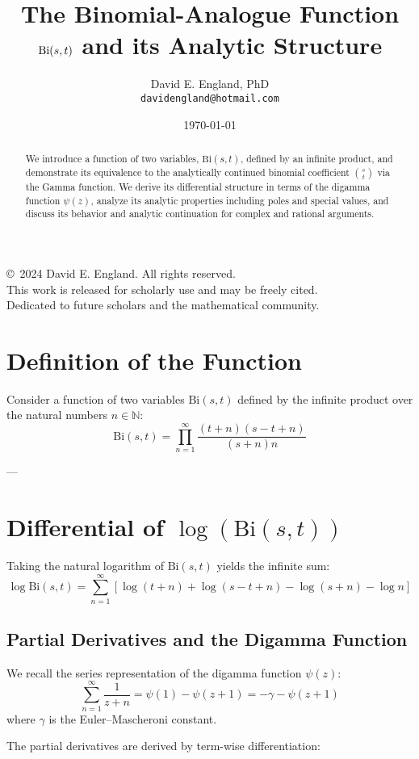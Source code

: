 \documentclass{article}
\title{The Binomial-Analogue Function $\Bi(s,t)$ and its Analytic Structure}
\author{David E. England, PhD \\ \texttt{davidengland@hotmail.com}}
\date{\today}
\newcommand{\Bi}{\mathrm{Bi}}
\newcommand{\eulergam}{\gamma} %
\newcommand{\copyrightnote}{
  \vspace{2em}
  \begin{center}
    \small
    \copyright~2024 David E. England. All rights reserved.\\
    This work is released for scholarly use and may be freely cited.\\
    Dedicated to future scholars and the mathematical community.
  \end{center}
  \vspace{2em}
}
\begin{document}
\maketitle
\copyrightnote

\begin{abstract}
We introduce a function of two variables, $\Bi(s,t)$, defined by an infinite product, and demonstrate its equivalence to the analytically continued binomial coefficient $\binom{s}{t}$ via the Gamma function. We derive its differential structure in terms of the digamma function $\psi(z)$, analyze its analytic properties including poles and special values, and discuss its behavior and analytic continuation for complex and rational arguments.
\end{abstract}

\section{Definition of the Function}

Consider a function of two variables $\Bi(s,t)$ defined by the infinite product over the natural numbers $n \in \mathbb{N}$:
\begin{equation}
\Bi(s,t) = \prod_{n=1}^\infty \frac{(t+n)(s-t+n)}{(s+n)n}
\end{equation}

---

\section{Differential of $\log(\Bi(s,t))$}

Taking the natural logarithm of $\Bi(s,t)$ yields the infinite sum:
$$
\log \Bi(s,t) = \sum_{n=1}^\infty \left[ \log(t+n) + \log(s-t+n) - \log(s+n) - \log n \right]
$$

\subsection{Partial Derivatives and the Digamma Function}

We recall the series representation of the digamma function $\psi(z)$:
$$
\sum_{n=1}^\infty \frac{1}{z+n} = \psi(1) - \psi(z+1) = -\eulergam - \psi(z+1)
$$
where $\eulergam$ is the Euler--Mascheroni constant.

The partial derivatives are derived by term-wise differentiation:
\end{document}
